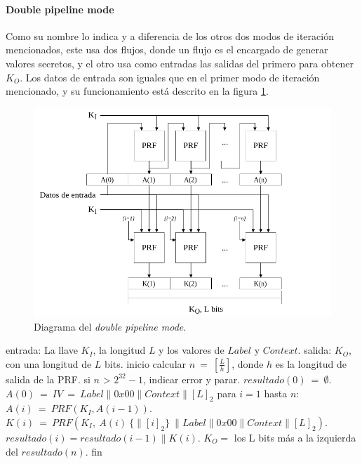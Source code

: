 \paragraph{Double pipeline mode}
Como su nombre lo indica y a diferencia de los otros dos modos de iteración
mencionados, este usa dos flujos, donde un flujo es el encargado de generar
valores secretos, y el otro usa como entradas las salidas del primero para
obtener $K_O$. Los datos de entrada son iguales que en el primer modo de
iteración mencionado, y su funcionamiento está descrito en la figura
\ref{diagrama_dpipeline_mode}.

\begin{figure}
  \begin{center}
    \includegraphics[width=0.75\linewidth]{diagramas/dpipeline_mode}
    \caption{Diagrama del \textit{double pipeline mode}.}
    \label{diagrama_dpipeline_mode}
   \end{center}
\end{figure}

\begin{pseudocodigo}[caption={Funcionamiento del \textit{double pipeline mode}.},
label={mi:3}]
    entrada:   La llave $K_I$, la longitud $L$ y los valores de $Label$ y $Context$.
    salida:    $K_O$, con una longitud de $L$ bits.
    inicio
      calcular $n\: =\: [\frac{L}{h}]$, donde $h$ es la longitud de salida de la PRF.
      si $n$ > $2^{32}-1$, indicar error y parar.
      $resultado(0)\: =\: \emptyset$.
      $A(0)\: =\: IV\: =\: Label \parallel 0x00 \parallel Context \parallel {[L]}_2$
      para $i=1$ hasta $n$:
        $A(i)\: =\: PRF(K_I, A(i-1))$.
        $K(i)\: =\: PRF(K_I,\: A(i)\: \{\parallel {[i]}_2\}\: \parallel Label \parallel 0x00 \parallel Context \parallel {[L]}_2)$.
        $resultado(i) = resultado(i-1) \parallel K(i)$.
      $K_O =$ los L bits más a la izquierda del $resultado(n)$.
    fin
\end{pseudocodigo}

